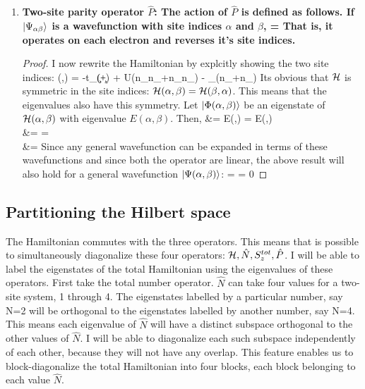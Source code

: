\documentclass[12pt]{article}
\begin{document}
\begin{enumerate}
\item \bf{Two-site parity operator \(\hat{P}\)}: The action of \(\hat{P}\) is defined as follows. If \(\ket{\Psi_{\alpha\beta}}\) is a wavefunction with site indices \(\alpha\) and \(\beta\), 
\beq
{}\ket{\Psi(\alpha,\beta)} = \ket{\Psi(\beta,\alpha)}
\eeq
That is, it operates on each electron and reverses it's site indices. 
\begin{proof}
I now rewrite the Hamiltonian by explcitly showing the two site indices:
\beq
\ham(\alpha,\beta) = -t\sum_\sigma(\C{\alpha}{\sigma}\c{\beta}{\sigma}+\C{\beta}{\sigma}\c{\alpha}{\sigma}) + U(n_{\alpha\uparrow}n_{\alpha\downarrow}+n_{\beta\uparrow}n_{\beta\downarrow}) - \mu\sum_\sigma(n_{\alpha\sigma}+n_{\beta\sigma})
\eeq 
Its obvious that \(\mathcal{H}\) is symmetric in the site indices: \(\mathcal{H}(\alpha,\beta) = \mathcal{H}(\beta,\alpha)\). This means that the eigenvalues also have this symmetry. Let \(\ket{\Phi(\alpha,\beta)}\) be an eigenstate of \(\mathcal{H}(\alpha,\beta)\) with eigenvalue \(E(\alpha,\beta)\). Then,
\beq
{}\ham\ket{\Phi(\alpha,\beta)} &= E(\alpha,\beta) \ket{\Phi(\alpha,\beta)} = E(\beta,\alpha) \ket{\Phi(\beta,\alpha)} \\
&= \ham \ket{\Phi(\beta,\alpha)} = \ham {} \ket{\Phi(\alpha,\beta)} \\
\implies \ham{}\ket{\Phi(\alpha,\beta)} &= \ham\ket{\Phi(\alpha,\beta)}
\eeq
Since any general wavefunction can be expanded in terms of these wavefunctions and since both the operator are linear, the above result will also hold for a general wavefunction \(\ket{\Psi(\alpha,\beta)}\):
\beq
\ham {} \ket{\Psi(\alpha,\beta)} =  \ham \ket{\Psi(\alpha,\beta)}
 = 0
\eeq
\end{proof}
\end{enumerate}
\subsection{Partitioning the Hilbert space}

The Hamiltonian commutes with the three operators. This means that is possible to simultaneously diagonalize these four operators: \(\mathcal{H}, \hat{N}, S_z^{tot}, \hat{P}\). I will be able to label the eigenstates of the total Hamiltonian using the eigenvalues of these operators. First take the total number operator. \(\hat{N}\) can take four values for a two-site system, 1 through 4. The eigenstates labelled by a particular number, say N=2 will be orthogonal to the eigenstates labelled by another number, say N=4. This means each eigenvalue of \(\hat{N}\) will have a distinct subspace orthogonal to the other values of \(\hat{N}\). I will be able to diagonalize each such subspace independently of each other, because they will not have any overlap. This feature enables us to block-diagonalize the total Hamiltonian into four blocks, each block belonging to each value \(\hat{N}\). 
\end{document}
